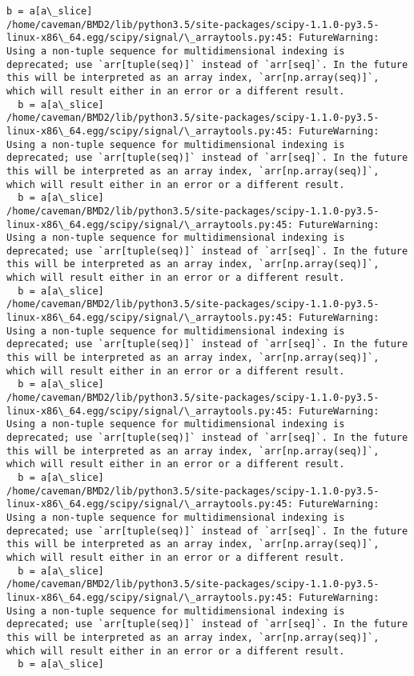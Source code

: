 \documentclass[11pt]{article}
\begin{document}
\begin{Verbatim}[commandchars=\\\{\}]
  b = a[a\_slice]
/home/caveman/BMD2/lib/python3.5/site-packages/scipy-1.1.0-py3.5-linux-x86\_64.egg/scipy/signal/\_arraytools.py:45: FutureWarning: Using a non-tuple sequence for multidimensional indexing is deprecated; use `arr[tuple(seq)]` instead of `arr[seq]`. In the future this will be interpreted as an array index, `arr[np.array(seq)]`, which will result either in an error or a different result.
  b = a[a\_slice]
/home/caveman/BMD2/lib/python3.5/site-packages/scipy-1.1.0-py3.5-linux-x86\_64.egg/scipy/signal/\_arraytools.py:45: FutureWarning: Using a non-tuple sequence for multidimensional indexing is deprecated; use `arr[tuple(seq)]` instead of `arr[seq]`. In the future this will be interpreted as an array index, `arr[np.array(seq)]`, which will result either in an error or a different result.
  b = a[a\_slice]
/home/caveman/BMD2/lib/python3.5/site-packages/scipy-1.1.0-py3.5-linux-x86\_64.egg/scipy/signal/\_arraytools.py:45: FutureWarning: Using a non-tuple sequence for multidimensional indexing is deprecated; use `arr[tuple(seq)]` instead of `arr[seq]`. In the future this will be interpreted as an array index, `arr[np.array(seq)]`, which will result either in an error or a different result.
  b = a[a\_slice]
/home/caveman/BMD2/lib/python3.5/site-packages/scipy-1.1.0-py3.5-linux-x86\_64.egg/scipy/signal/\_arraytools.py:45: FutureWarning: Using a non-tuple sequence for multidimensional indexing is deprecated; use `arr[tuple(seq)]` instead of `arr[seq]`. In the future this will be interpreted as an array index, `arr[np.array(seq)]`, which will result either in an error or a different result.
  b = a[a\_slice]
/home/caveman/BMD2/lib/python3.5/site-packages/scipy-1.1.0-py3.5-linux-x86\_64.egg/scipy/signal/\_arraytools.py:45: FutureWarning: Using a non-tuple sequence for multidimensional indexing is deprecated; use `arr[tuple(seq)]` instead of `arr[seq]`. In the future this will be interpreted as an array index, `arr[np.array(seq)]`, which will result either in an error or a different result.
  b = a[a\_slice]
/home/caveman/BMD2/lib/python3.5/site-packages/scipy-1.1.0-py3.5-linux-x86\_64.egg/scipy/signal/\_arraytools.py:45: FutureWarning: Using a non-tuple sequence for multidimensional indexing is deprecated; use `arr[tuple(seq)]` instead of `arr[seq]`. In the future this will be interpreted as an array index, `arr[np.array(seq)]`, which will result either in an error or a different result.
  b = a[a\_slice]
/home/caveman/BMD2/lib/python3.5/site-packages/scipy-1.1.0-py3.5-linux-x86\_64.egg/scipy/signal/\_arraytools.py:45: FutureWarning: Using a non-tuple sequence for multidimensional indexing is deprecated; use `arr[tuple(seq)]` instead of `arr[seq]`. In the future this will be interpreted as an array index, `arr[np.array(seq)]`, which will result either in an error or a different result.
  b = a[a\_slice]

    \end{Verbatim}
\end{document}
